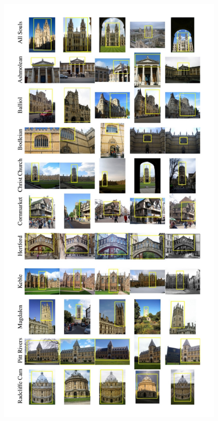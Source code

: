 \begin{figure}[!htbp]
  \begin{center}
    \leavevmode
    \ifpdf
      \includegraphics[scale=0.27]{oxfordDataset}
    \else

\end{center}
\end{figure}
